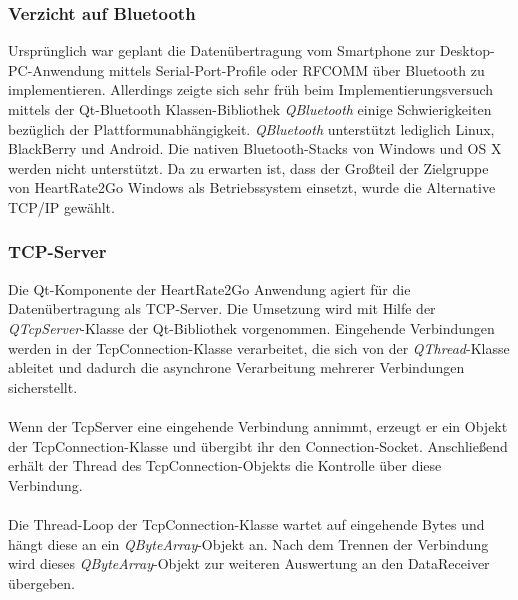 \subsubsection{Verzicht auf Bluetooth}
Ursprünglich war geplant die Datenübertragung vom Smartphone zur Desktop-PC-Anwendung mittels Serial-Port-Profile oder RFCOMM über Bluetooth zu implementieren. Allerdings zeigte sich sehr früh beim Implementierungsversuch mittels der Qt-Bluetooth Klassen-Bibliothek \textit{QBluetooth} einige Schwierigkeiten bezüglich der Plattformunabhängigkeit. \textit{QBluetooth} unterstützt lediglich Linux, BlackBerry und Android\cite{qtbluetooth}. Die nativen Bluetooth-Stacks von Windows und OS X werden nicht unterstützt. Da zu erwarten ist, dass der Großteil der Zielgruppe von HeartRate2Go Windows als Betriebssystem einsetzt, wurde die Alternative TCP/IP gewählt.

\subsubsection{TCP-Server}
Die Qt-Komponente der HeartRate2Go Anwendung agiert für die Datenübertragung als TCP-Server. Die Umsetzung wird mit Hilfe der \textit{QTcpServer}-Klasse der Qt-Bibliothek vorgenommen\cite{qtcpserver}. Eingehende Verbindungen werden in der TcpConnection-Klasse verarbeitet, die sich von der \textit{QThread}-Klasse ableitet und dadurch die asynchrone Verarbeitung mehrerer Verbindungen sicherstellt.\\
\\
Wenn der TcpServer eine eingehende Verbindung annimmt, erzeugt er ein Objekt der TcpConnection-Klasse und übergibt ihr den Connection-Socket. Anschließend erhält der Thread des TcpConnection-Objekts die Kontrolle über diese Verbindung.\\
\\
Die Thread-Loop der TcpConnection-Klasse wartet auf eingehende Bytes und hängt diese an ein \textit{QByteArray}-Objekt an. Nach dem Trennen der Verbindung wird dieses \textit{QByteArray}-Objekt zur weiteren Auswertung an den DataReceiver übergeben.


